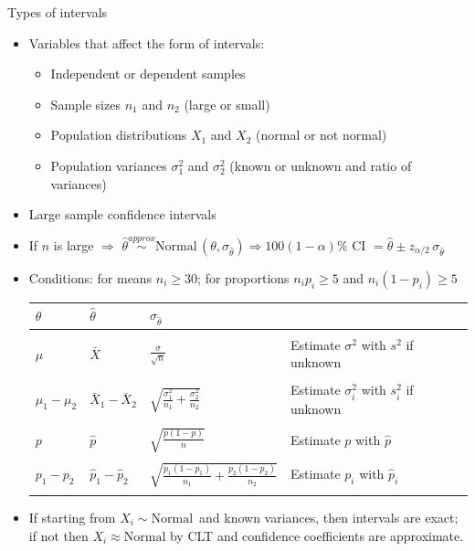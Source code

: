 \documentclass{article}
\newcommand{\follow}[1]{\sim \text{#1}\,}		%
\newcommand{\followsp}[2]{\overset{#1}\sim \text{#2}\,}		%
\begin{document}
Types of intervals
\begin{itemize}
    \item Variables that affect the form of intervals:
    \begin{itemize}
        \item Independent or dependent samples
        \item Sample sizes $n_1$ and $n_2$ (large or small)
        \item Population distributions $X_1$ and $X_2$ (normal or not normal)
        \item Population variances $\sigma^2_1$ and $\sigma^2_2$ (known or unknown and ratio of variances)
    \end{itemize}
    \item Large sample confidence intervals
    \item[] If $n$ is large $\Longrightarrow$ $\hat{\theta} \followsp{approx}{Normal}(\theta, \sigma_{\hat{\theta}}) \Longrightarrow 100 (1 - \alpha)\% \text{ CI } = \hat{\theta} \pm z_{\alpha / 2} \, \sigma_{\hat{\theta}}$
    \item[] Conditions: for means $n_i \ge 30$; for proportions $n_i p_i \ge 5$ and $n_i (1 - p_i) \ge 5$ \bigskip\\
    \begin{tabular}{llll}
    $\theta$ & $\hat{\theta}$ & $\sigma_{\hat{\theta}}$ & \\
    \hline\\
    $\mu$ & $\bar{X}$ & $\displaystyle \frac{\sigma}{\sqrt{n}}$ & Estimate $\sigma^2$ with $s^2$ if unknown \\\\
    $\mu_1 - \mu_2$ & $\bar{X}_1 - \bar{X}_2$ & $\displaystyle \sqrt{\frac{\sigma^2_1}{n_1} + \frac{\sigma^2_2}{n_2}}$ & Estimate $\sigma^2_i$ with $s^2_i$ if unknown \\\\
    $p$ & $\hat{p}$ & $\displaystyle \sqrt{\frac{p (1 - p)}{n}}$ & Estimate $p$ with $\hat{p}$ \\\\
    $p_1 - p_2$ & $\hat{p}_1 - \hat{p}_2$ & $\displaystyle \sqrt{\frac{p_1 (1 - p_1)}{n_1} + \frac{p_2 (1 - p_2)}{n_2}}$ & Estimate $p_i$ with $\hat{p}_i$ \\\\
    \end{tabular}
    \item[] If starting from $X_i \follow{Normal}$ and known variances, then intervals are exact; if not then $X_i \approx \text{Normal}$ by CLT and confidence coefficients are approximate.\newpage

\end{itemize}
\end{document}
